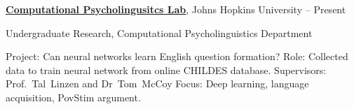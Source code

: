 \documentclass[letterpaper,MMMyyyy,nonstopmode,14pt]{simpleresumecv}
\begin{document}
\begin{Body}
\Section
\Entry
\href{http://www.example.com/my-institute}
{\textbf{Computational Psycholingusitcs Lab}},
Johns Hopkins University 
\hfill
{} --
Present

\BulletItem
Undergraduate Research, Computational Psycholinguistics Department
\begin{Detail}
	\SubBulletItem
	Project:
	Can neural networks learn English question formation?
	\SubBulletItem
	Role:
    Collected data to train neural network from online CHILDES database.
	\SubBulletItem
	Supervisors:
	Prof.~Tal~Linzen and
	Dr~Tom~McCoy
	\SubBulletItem
	Focus:
	Deep learning, language acquisition, PovStim argument.
\end{Detail}

{
%
%
%
%
%
%
%
%
%
%
%
%
}


\end{Body}
\end{document}
